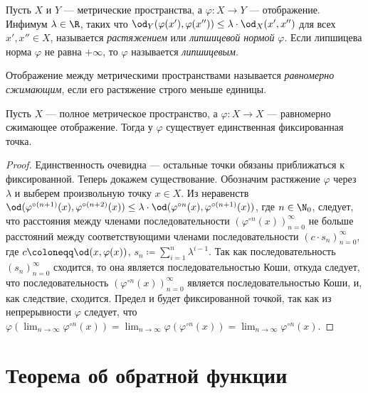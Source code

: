 \documentclass[
	extrafontsizes,
	11pt,
	hyphens,
]{memoir}
\begin{document}
\begin{definition}
Пусть \(X\) и \(Y\) --- метрические пространства,
а \(\varphi: X \to Y\) --- отображение.
Инфимум \(\lambda \in \R\), таких что
\(\od_Y(\varphi(x'), \varphi(x'')) \leq \lambda \cdot \od_X(x', x'')\)
для всех \(x',x'' \in X\),
называется \emph{растяжением} или \emph{липшицевой нормой} \(\varphi\).
Если липшицева норма \(\varphi\) не равна \(+\infty\), то \(\varphi\) называется \emph{липшицевым}.
\end{definition}

\begin{definition}
Отображение между метрическими пространствами называется \emph{равномерно сжимающим}, если его растяжение строго меньше единицы.
\end{definition}

\begin{theorem}
Пусть \(X\) --- полное метрическое пространство, а
\(\varphi: X \to X\) --- равномерно сжимающее отображение. Тогда у \(\varphi\) существует единственная фиксированная точка.
\end{theorem}

\begin{proof}
Единственность очевидна --- остальные точки обязаны приближаться к фиксированной.
Теперь докажем существование.
Обозначим растяжение \(\varphi\) через \(\lambda\) и выберем произвольную точку \(x \in X\).
Из неравенств
\(
\od(\varphi^{\circ (n+1)}(x), \varphi^{\circ (n+2)}(x))
\leq
\lambda \cdot
\od(\varphi^{\circ n}(x), \varphi^{\circ (n+1)}(x)) 
\),
где \(n \in \N_0\),
следует, что расстояния между членами последовательности \((\varphi^{\circ n}(x))_{n = 0}^\infty\) не больше расстояний между соответствующими членами последовательности
\((c \cdot s_n)_{n=0}^\infty\),
где
\(c \coloneqq \od(x, \varphi(x))\),
\(s_n \coloneqq \sum_{i = 1}^n \lambda^{i-1}\).
Так как последовательность
\((s_n)_{n=0}^\infty\)
сходится, то она является последовательностью Коши, откуда следует, что последовательность \((\varphi^{\circ n}(x))_{n = 0}^\infty\) является последовательностью Коши, и, как следствие, сходится.
Предел и будет фиксированной точкой, так как из непрерывности \(\varphi\) следует, что
\(\varphi(\lim_{n \to \infty} \varphi^{\circ n}(x)) = \lim_{n \to \infty} \varphi(\varphi^{\circ n}(x)) = \lim_{n \to \infty} \varphi^{\circ n}(x)\).
\end{proof}


\section{Теорема об обратной функции}
\end{document}

